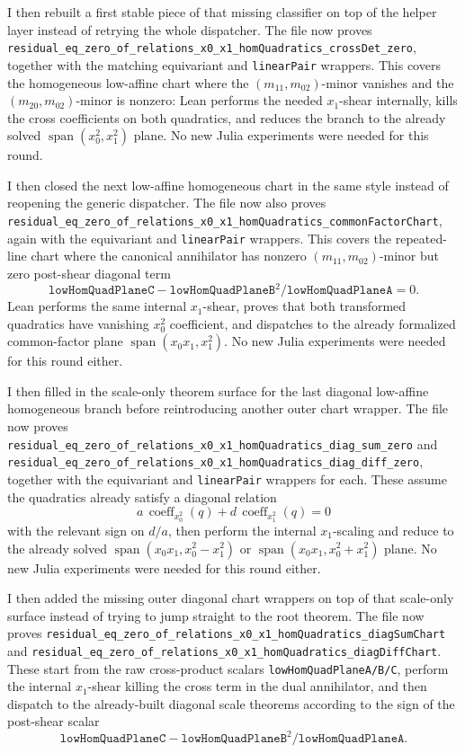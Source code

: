 \documentclass[11pt]{article}
\begin{document}
I then rebuilt a first stable piece of that missing classifier on top of the
helper layer instead of retrying the whole dispatcher. The file now proves
\texttt{residual\_eq\_zero\_of\_relations\_x0\_x1\_homQuadratics\_crossDet\_zero},
together with the matching equivariant and \texttt{linearPair} wrappers. This
covers the homogeneous low-affine chart where the
\((m_{11},m_{02})\)-minor vanishes and the \((m_{20},m_{02})\)-minor is
nonzero: Lean performs the needed \(x_1\)-shear internally, kills the cross
coefficients on both quadratics, and reduces the branch to the already solved
\(\operatorname{span}(x_0^2,x_1^2)\) plane. No new Julia experiments were
needed for this round.

I then closed the next low-affine homogeneous chart in the same style instead
of reopening the generic dispatcher. The file now also proves
\texttt{residual\_eq\_zero\_of\_relations\_x0\_x1\_homQuadratics\_commonFactorChart},
again with the equivariant and \texttt{linearPair} wrappers. This covers the
repeated-line chart where the canonical annihilator has nonzero
\((m_{11},m_{02})\)-minor but zero post-shear diagonal term
\[
  \texttt{lowHomQuadPlaneC} - \texttt{lowHomQuadPlaneB}^2 /
  \texttt{lowHomQuadPlaneA} = 0.
\]
Lean performs the same internal \(x_1\)-shear, proves that both transformed
quadratics have vanishing \(x_0^2\) coefficient, and dispatches to the already
formalized common-factor plane
\(\operatorname{span}(x_0x_1,x_1^2)\). No new Julia experiments were needed for
this round either.

I then filled in the scale-only theorem surface for the last diagonal
low-affine homogeneous branch before reintroducing another outer chart wrapper.
The file now proves
\texttt{residual\_eq\_zero\_of\_relations\_x0\_x1\_homQuadratics\_diag\_sum\_zero}
and
\texttt{residual\_eq\_zero\_of\_relations\_x0\_x1\_homQuadratics\_diag\_diff\_zero},
together with the equivariant and \texttt{linearPair} wrappers for each. These
assume the quadratics already satisfy a diagonal relation
\[
  a\,\operatorname{coeff}_{x_0^2}(q)+d\,\operatorname{coeff}_{x_1^2}(q)=0
\]
with the relevant sign on \(d/a\), then perform the internal \(x_1\)-scaling
and reduce to the already solved
\(\operatorname{span}(x_0x_1,x_0^2-x_1^2)\) or
\(\operatorname{span}(x_0x_1,x_0^2+x_1^2)\) plane. No new Julia experiments
were needed for this round either.

I then added the missing outer diagonal chart wrappers on top of that scale-only
surface instead of trying to jump straight to the root theorem. The file now
proves
\texttt{residual\_eq\_zero\_of\_relations\_x0\_x1\_homQuadratics\_diagSumChart}
and
\texttt{residual\_eq\_zero\_of\_relations\_x0\_x1\_homQuadratics\_diagDiffChart}.
These start from the raw cross-product scalars
\texttt{lowHomQuadPlaneA/B/C}, perform the internal \(x_1\)-shear killing the
cross term in the dual annihilator, and then dispatch to the already-built
diagonal scale theorems according to the sign of the post-shear scalar
\[
  \texttt{lowHomQuadPlaneC} - \texttt{lowHomQuadPlaneB}^2 /
  \texttt{lowHomQuadPlaneA}.
\]
\end{document}

